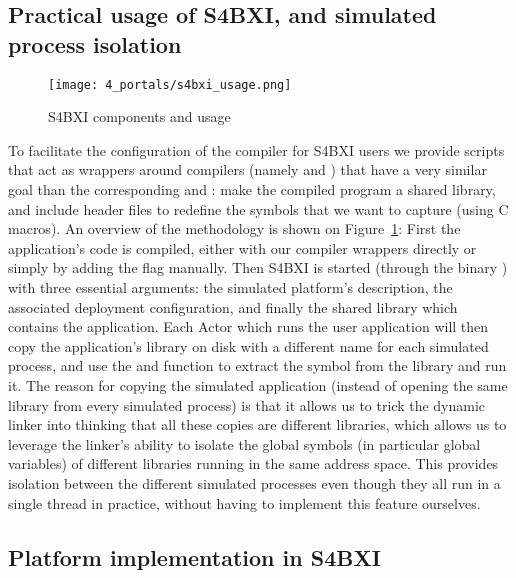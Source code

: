 \subsection{Practical usage of S4BXI, and simulated process isolation}
\label{subsec:4_portals:process_isolation}

\begin{figure}[!ht]
    \centering
    \texttt{[image: 4\_portals/s4bxi\_usage.png]}
    \caption{S4BXI components and usage}
    \label{fig:4_portals:s4bxi_usage}
\end{figure}

To facilitate the configuration of the compiler for S4BXI users we provide
scripts that act as wrappers around compilers (namely  and
) that have a very similar goal than the corresponding
 and : make the compiled program a shared
library, and include header files to redefine the symbols that we want to
capture (using C macros). An overview of the methodology is shown on
Figure~\ref{fig:4_portals:s4bxi_usage}: First the application's code is
compiled, either with our compiler wrappers directly or simply by adding the
 flag manually. Then S4BXI is started (through the binary
) with three essential arguments: the simulated platform's
description, the associated deployment configuration, and finally the shared
library which contains the application. Each Actor which runs the user
application will then copy the application's library on disk with a different
name for each simulated process, and use the  and 
function to extract the  symbol from the library and run it. The
reason for copying the simulated application (instead of opening the same
library from every simulated process) is that it allows us to trick the dynamic
linker into thinking that all these copies are different libraries, which allows
us to leverage the linker's ability to isolate the global symbols (in particular
global variables) of different libraries running in the same address space. This
provides isolation between the different simulated processes even though they
all run in a single thread in practice, without having to implement this feature
ourselves.

\subsection{Platform implementation in S4BXI}

